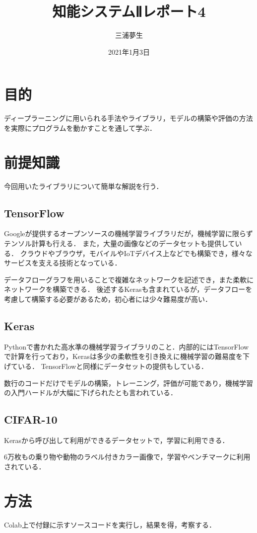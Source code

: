 \documentclass[a4paper, titlepage]{jsarticle}
\title{知能システムⅡレポート4}
\author{三浦夢生}
\date{2021年1月3日}
\begin{document}
	\maketitle

	\section{目的}
	ディープラーニングに用いられる手法やライブラリ，モデルの構築や評価の方法を実際にプログラムを動かすことを通して学ぶ．

	\section{前提知識}
	今回用いたライブラリについて簡単な解説を行う．
	
	\subsection{TensorFlow}
	Googleが提供するオープンソースの機械学習ライブラリだが，機械学習に限らずテンソル計算も行える．
	また，大量の画像などのデータセットも提供している．
	クラウドやブラウザ，モバイルやIoTデバイス上などでも構築でき，様々なサービスを支える技術となっている．

	データフローグラフを用いることで複雑なネットワークを記述でき，また柔軟にネットワークを構築できる．
	後述するKerasも含まれているが，データフローを考慮して構築する必要があるため，初心者には少々難易度が高い．

	\subsection{Keras}
	Pythonで書かれた高水準の機械学習ライブラリのこと．内部的にはTensorFlowで計算を行っており，Kerasは多少の柔軟性を引き換えに機械学習の難易度を下げている．
	TensorFlowと同様にデータセットの提供もしている．

	数行のコードだけでモデルの構築，トレーニング，評価が可能であり，機械学習の入門ハードルが大幅に下げられたとも言われている．

	\subsection{CIFAR-10}
	Kerasから呼び出して利用ができるデータセットで，学習に利用できる．

	6万枚もの乗り物や動物のラベル付きカラー画像で，学習やベンチマークに利用されている．

	\section{方法}
	Colab上で付録に示すソースコードを実行し，結果を得，考察する．
\end{document}
